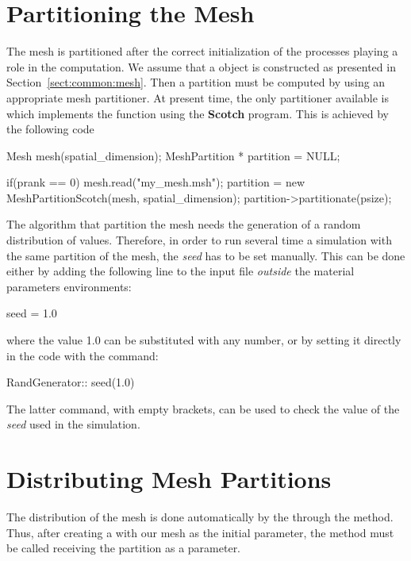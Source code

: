\section{Partitioning the Mesh}

The mesh is partitioned after the correct initialization of the
processes playing a role in the computation. We assume that a
 object is constructed as presented in
Section~\ref{sect:common:mesh}.  Then a partition must be computed by
using an appropriate mesh partitioner. At present time, the only
partitioner available is  which implements
the function  using the
\textbf{Scotch}\cite{scotch} program.  This is achieved by the
following code

\begin{cpp}
  Mesh mesh(spatial_dimension);
  MeshPartition * partition = NULL;

  if(prank == 0) {
    mesh.read("my_mesh.msh");
    partition = new MeshPartitionScotch(mesh, spatial_dimension);
    partition->partitionate(psize);
  }
\end{cpp}

The algorithm that partition the mesh needs the generation of a random
distribution of values. Therefore, in order to run several time a
simulation with the same partition of the mesh, the \emph{seed} has to
be set manually.  This can be done either by adding the following line
to the input file \emph{outside} the material parameters environments:
\begin{cpp}
  seed = 1.0
\end{cpp}
where the value 1.0 can be substituted with any number, or by setting
it directly in the code with the command:
\begin{cpp}
  RandGenerator:: seed(1.0)
\end{cpp}
The latter command, with empty brackets, can be used to check the value
of the \emph{seed} used in the simulation.


\section{Distributing Mesh Partitions}

The distribution of the mesh is done automatically by the
 through the  method.  Thus,
after creating a  with our mesh as the initial
parameter, the  method must be called receiving the partition
as a parameter.

